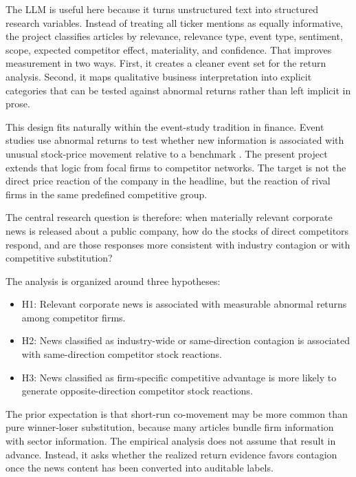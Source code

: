\documentclass[11pt]{article}
\begin{document}
The LLM is useful here because it turns unstructured text into structured research variables. Instead of treating all ticker mentions as equally informative, the project classifies articles by relevance, relevance type, event type, sentiment, scope, expected competitor effect, materiality, and confidence. That improves measurement in two ways. First, it creates a cleaner event set for the return analysis. Second, it maps qualitative business interpretation into explicit categories that can be tested against abnormal returns rather than left implicit in prose.

This design fits naturally within the event-study tradition in finance. Event studies use abnormal returns to test whether new information is associated with unusual stock-price movement relative to a benchmark \cite{fama1969,brownwarner1985,mackinlay1997}. The present project extends that logic from focal firms to competitor networks. The target is not the direct price reaction of the company in the headline, but the reaction of rival firms in the same predefined competitive group.

The central research question is therefore: when materially relevant corporate news is released about a public company, how do the stocks of direct competitors respond, and are those responses more consistent with industry contagion or with competitive substitution?

The analysis is organized around three hypotheses:

\begin{itemize}
    \item H1: Relevant corporate news is associated with measurable abnormal returns among competitor firms.
    \item H2: News classified as industry-wide or same-direction contagion is associated with same-direction competitor stock reactions.
    \item H3: News classified as firm-specific competitive advantage is more likely to generate opposite-direction competitor stock reactions.
\end{itemize}

The prior expectation is that short-run co-movement may be more common than pure winner-loser substitution, because many articles bundle firm information with sector information. The empirical analysis does not assume that result in advance. Instead, it asks whether the realized return evidence favors contagion once the news content has been converted into auditable labels.
\end{document}

